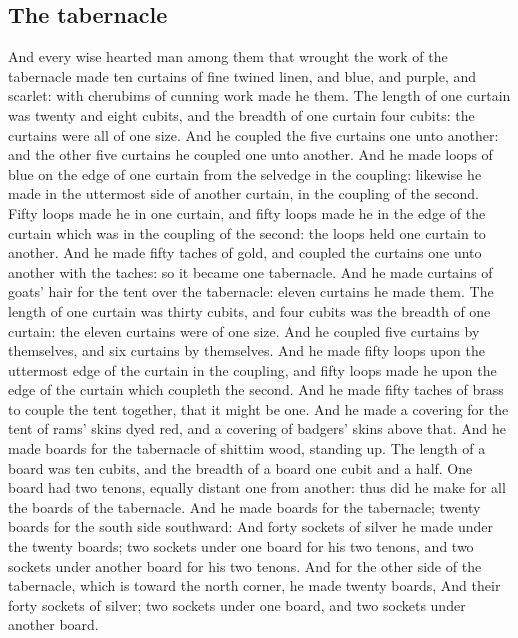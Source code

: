 \begin{biblechapter}
\section*{The tabernacle}
\verse And every wise hearted man among them that wrought the work of the tabernacle made ten curtains of fine twined linen, and blue, and purple, and scarlet: with cherubims of cunning work made he them.
\verse The length of one curtain was twenty and eight cubits, and the breadth of one curtain four cubits: the curtains were all of one size.
\verse And he coupled the five curtains one unto another: and the other five curtains he coupled one unto another.
\verse And he made loops of blue on the edge of one curtain from the selvedge in the coupling: likewise he made in the uttermost side of another curtain, in the coupling of the second.
\verse Fifty loops made he in one curtain, and fifty loops made he in the edge of the curtain which was in the coupling of the second: the loops held one curtain to another.
\verse And he made fifty taches of gold, and coupled the curtains one unto another with the taches: so it became one tabernacle.
\verse And he made curtains of goats' hair for the tent over the tabernacle: eleven curtains he made them.
\verse The length of one curtain was thirty cubits, and four cubits was the breadth of one curtain: the eleven curtains were of one size.
\verse And he coupled five curtains by themselves, and six curtains by themselves.
\verse And he made fifty loops upon the uttermost edge of the curtain in the coupling, and fifty loops made he upon the edge of the curtain which coupleth the second.
\verse And he made fifty taches of brass to couple the tent together, that it might be one.
\verse And he made a covering for the tent of rams' skins dyed red, and a covering of badgers' skins above that.
\verse And he made boards for the tabernacle of shittim wood, standing up.
\verse The length of a board was ten cubits, and the breadth of a board one cubit and a half.
\verse One board had two tenons, equally distant one from another: thus did he make for all the boards of the tabernacle.
\verse And he made boards for the tabernacle; twenty boards for the south side southward:
\verse And forty sockets of silver he made under the twenty boards; two sockets under one board for his two tenons, and two sockets under another board for his two tenons.
\verse And for the other side of the tabernacle, which is toward the north corner, he made twenty boards,
\verse And their forty sockets of silver; two sockets under one board, and two sockets under another board.

\end{biblechapter}
